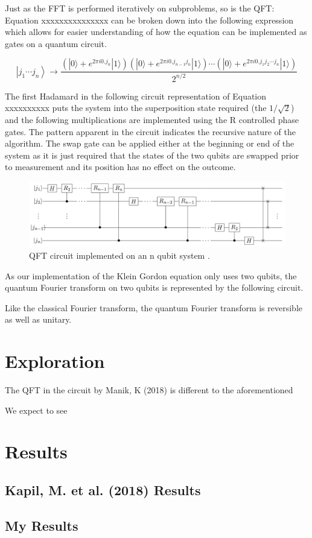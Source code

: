 \documentclass{article}
\begin{document}
Just as the FFT is performed iteratively on subproblems, so is the QFT: Equation xxxxxxxxxxxxxxx can be broken down into the following expression which allows for easier understanding of how the equation can be implemented as gates on a quantum circuit.

\begin{equation}
\left|j_{1} \cdots j_{n}\right\rangle \rightarrow \frac{\left(|0\rangle+ e^{2 \pi i 0 . j_{n}}|1\rangle\right)\left(|0\rangle+ e^{2 \pi i 0 . j_{n-1} j_{n}}|1\rangle\right) \cdots\left(|0\rangle+ e^{2 \pi i 0 . j_{1} j_{2} \cdots j_{n}}|1\rangle\right)}{2^{n / 2}}
\end{equation}

The first Hadamard in the following circuit representation of Equation xxxxxxxxxx puts the system into the superposition state required (the $1/\sqrt{2}$) and the following multiplications are implemented using the R controlled phase gates. The pattern apparent in the circuit indicates the recursive nature of the algorithm. The swap gate can be applied either at the beginning or end of the system as it is just required that the states of the two qubits are swapped prior to measurement and its position has no effect on the outcome.

\begin{figure}[!htb]
\includegraphics[scale=0.35]{../images/qft_circuit}
  \centering
  \caption{QFT circuit implemented on an n qubit system \cite{jurgen}.}
\end{figure}

As our implementation of the Klein Gordon equation only uses two qubits, the quantum Fourier transform on two qubits is represented by the following circuit.


Like the classical Fourier transform, the quantum Fourier transform is reversible as well as unitary.

\section{Exploration}
The QFT in the circuit by Manik, K (2018) \cite{manik} is different to the aforementioned 

We expect to see 

\section{Results}
\subsection{Kapil, M. et al. (2018) Results}

\subsection{My Results}




\end{document}
